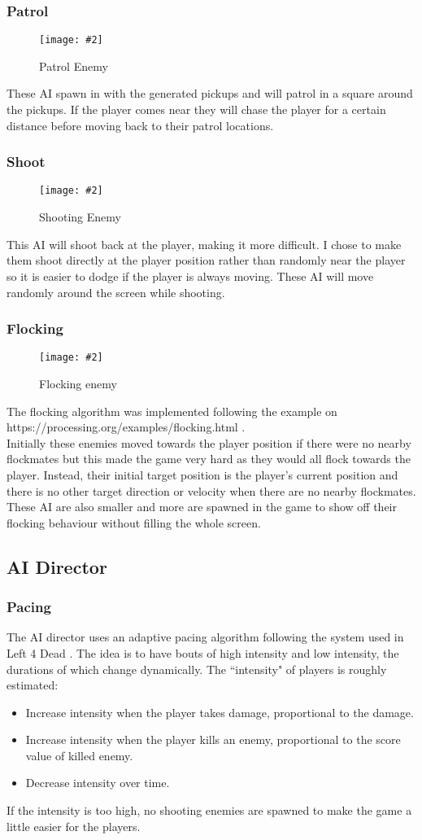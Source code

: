 \documentclass{article}
\newcommand{\n}[0]{\\[\baselineskip]}
\newcommand{\figimg}[3]{
  \begin{figure}[H]
    \centering
    \texttt{[image: \#2]}
    \caption{#3}
  \end{figure}
  \noindent 
}
\begin{document}
\subsubsection{Patrol}
\figimg{0.1}{imgs/PatrolEnemy.png}{Patrol Enemy}
These AI spawn in with the generated pickups and will patrol in a square around the pickups. If the player comes near they will chase the player for a certain distance before moving back to their patrol locations. 

\subsubsection{Shoot}
\figimg{0.1}{imgs/ShootEnemy.png}{Shooting Enemy}
This AI will shoot back at the player, making it more difficult. I chose to make them shoot directly at the player position rather than randomly near the player so it is easier to dodge if the player is always moving. These AI will move randomly around the screen while shooting.

\subsubsection{Flocking}
\figimg{0.1}{imgs/FlockingEnemy.png}{Flocking enemy}
The flocking algorithm was implemented following the example on https://processing.org/examples/flocking.html \cite{flocking}. 
\n
Initially these enemies moved towards the player position if there were no nearby flockmates but this made the game very hard as they would all flock towards the player. Instead, their initial target position is the player's current position and there is no other target direction or velocity when there are no nearby flockmates. 
\n
These AI are also smaller and more are spawned in the game to show off their flocking behaviour without filling the whole screen.

\subsection{AI Director}
\subsubsection{Pacing}
The AI director uses an adaptive pacing algorithm following the system used in Left 4 Dead \cite{l4d}. The idea is to have bouts of high intensity and low intensity, the durations of which change dynamically. The ``intensity" of players is roughly estimated:
\begin{itemize}
\item Increase intensity when the player takes damage, proportional to the damage.
\item Increase intensity when the player kills an enemy, proportional to the score value of killed enemy.
\item Decrease intensity over time. 
\end{itemize}
\noindent
If the intensity is too high, no shooting enemies are spawned to make the game a little easier for the players.
\end{document}
